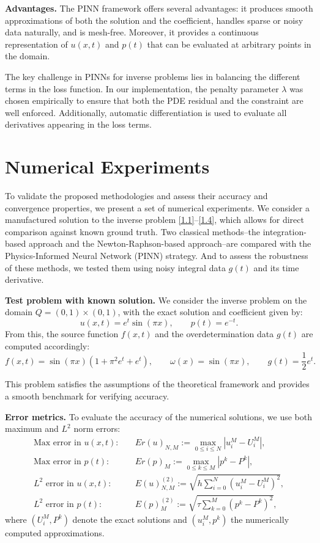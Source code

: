 \documentclass[reqno]{amsart}
\begin{document}
\medskip

\textbf{Advantages.}
The PINN framework offers several advantages: it produces smooth approximations of both the solution and the coefficient, handles sparse or noisy data naturally, and is mesh-free. Moreover, it provides a continuous representation of \( u(x,t) \) and \( p(t) \) that can be evaluated at arbitrary points in the domain.

\begin{remark}
The key challenge in PINNs for inverse problems lies in balancing the different terms in the loss function. In our implementation, the penalty parameter \( \lambda \) was chosen empirically to ensure that both the PDE residual and the constraint are well enforced. Additionally, automatic differentiation is used to evaluate all derivatives appearing in the loss terms.
\end{remark}

\section{Numerical Experiments}\label{6}

To validate the proposed methodologies and assess their accuracy and convergence properties, we present a set of numerical experiments. We consider a manufactured solution to the inverse problem \eqref{1.1}--\eqref{1.4}, which allows for direct comparison against known ground truth. Two classical methods--the integration-based approach and the Newton-Raphson-based approach--are compared with the Physics-Informed Neural Network (PINN) strategy. And to assess the robustness of these methods, we tested them using noisy integral data $g(t)$ and its time derivative.

\textbf{Test problem with known solution.}
We consider the inverse problem on the domain \( Q = (0,1) \times (0,1) \), with the exact solution and coefficient given by:
\[
    u(x,t) = e^t \sin(\pi x), \qquad p(t) = e^{-t}.
\]
From this, the source function \( f(x,t) \) and the overdetermination data \( g(t) \) are computed accordingly:
\[
    f(x,t) = \sin(\pi x)(1 + \pi^2 e^t + e^t), \qquad \omega(x) = \sin(\pi x), \qquad g(t) = \frac{1}{2} e^t.
\]

This problem satisfies the assumptions of the theoretical framework and provides a smooth benchmark for verifying accuracy.

\textbf{Error metrics.}
To evaluate the accuracy of the numerical solutions, we use both maximum and $L^2$ norm errors:
\begin{align*}
    \text{Max error in } u(x,t): \quad & Er(u)_{N,M} := \max_{0 \leq i \leq N} |u_i^M - U_i^M|, \\
    \text{Max error in } p(t): \quad & Er(p)_M := \max_{0 \leq k \leq M} |p^k - P^k|, \\
    \text{$L^2$ error in } u(x,t): \quad & E(u)^{(2)}_{N,M} := \sqrt{h \sum_{i=0}^{N} (u_i^M - U_i^M)^2}, \\
    \text{$L^2$ error in } p(t): \quad & E(p)^{(2)}_M := \sqrt{\tau \sum_{k=0}^{M} (p^k - P^k)^2},
\end{align*}
where \( (U_i^M, P^k) \) denote the exact solutions and \( (u_i^M, p^k) \) the numerically computed approximations.
\end{document}
